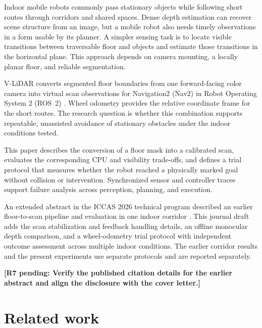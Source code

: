 \documentclass[pdflatex,sn-mathphys-num]{sn-jnl}
\newif\ifdraftreview
\newcommand{\reviewbadge}[1]{%
  \colorbox{reviewfill}{\textcolor{reviewink}{\sffamily\bfseries\strut #1}}}
\newcommand{\pending}[2]{%
  \ifdraftreview
    \hyperlink{author-checklist}{\reviewbadge{#1}}\nobreak\space
    \textcolor{reviewink}{\textbf{[Pending: #2]}}%
  \else
    \textbf{[#1 pending: #2]}%
  \fi}
\newcommand{\vlidar}{V-LiDAR}
\begin{document}
Indoor mobile robots commonly pass stationary objects while following short routes through corridors and shared spaces. Dense depth estimation can recover scene structure from an image, but a mobile robot also needs timely observations in a form usable by its planner. A simpler sensing task is to locate visible transitions between traversable floor and objects and estimate those transitions in the horizontal plane. This approach depends on camera mounting, a locally planar floor, and reliable segmentation.

\vlidar{} converts segmented floor boundaries from one forward-facing color camera into virtual scan observations for Navigation2 (Nav2) in Robot Operating System 2 (ROS~2) \cite{macenski_2022_robot,macenski_2020_the}. Wheel odometry provides the relative coordinate frame for the short routes. The research question is whether this combination supports repeatable, unassisted avoidance of stationary obstacles under the indoor conditions tested.

This paper describes the conversion of a floor mask into a calibrated scan, evaluates the corresponding CPU and visibility trade-offs, and defines a trial protocol that measures whether the robot reached a physically marked goal without collision or intervention. Synchronized sensor and controller traces support failure analysis across perception, planning, and execution.

An extended abstract in the ICCAS 2026 technical program described an earlier floor-to-scan pipeline and evaluation in one indoor corridor \cite{lee2026iccas}. This journal draft adds the scan stabilization and feedback handling details, an offline monocular depth comparison, and a wheel-odometry trial protocol with independent outcome assessment across multiple indoor conditions. The earlier corridor results and the present experiments use separate protocols and are reported separately.

\pending{R7}{Verify the published citation details for the earlier abstract and align the disclosure with the cover letter.}

\section{Related work}\label{sec:related}
\end{document}
